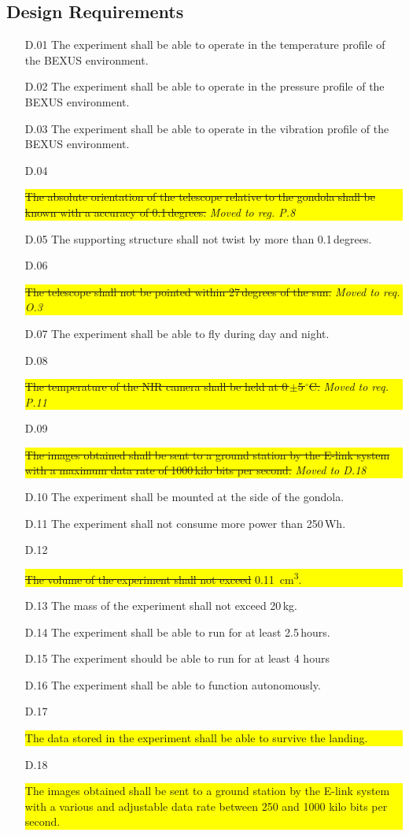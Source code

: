 \subsection{Design Requirements}

\begin{enumerate}[topsep=0pt,itemsep=-1ex,partopsep=1ex,parsep=1ex]
	\item[D.01] The experiment shall be able to operate in the temperature profile of the BEXUS environment.
	\item[D.02] The experiment shall be able to operate in the pressure profile of the BEXUS environment.
    \item[D.03] The experiment shall be able to operate in the vibration profile of the BEXUS environment.
    \item[D.04] \colorbox{yellow}{\parbox{\textwidth}{\st{The absolute orientation of the telescope relative to the gondola shall be known with a accuracy of 0.1\,degrees.} \textit{Moved to reg. P.8}}}
	\item[D.05] The supporting structure shall not twist by more than 0.1\,degrees.
	\item[D.06] \colorbox{yellow}{\parbox{\textwidth}{\st{The telescope shall not be pointed within 27\,degrees of the sun.} \textit{Moved to req. O.3}}}
	\item[D.07] The experiment shall be able to fly during day and night.
	\item[D.08] \colorbox{yellow}{\parbox{\textwidth}{\st{The temperature of the NIR camera shall be held at 0\,$\pm$5\,$^\circ$C.} \textit{Moved to req. P.11}}}
	\item[D.09] \colorbox{yellow}{\parbox{\textwidth}{\st{The images obtained shall be sent to a ground station by the E-link system with a maximum data rate of 1000\,kilo bits per second.} \textit{Moved to D.18}}}
	\item[D.10] The experiment shall be mounted at the side of the gondola.
	\item[D.11] The experiment shall not consume more power than 250\,Wh.
    \item[D.12] \colorbox{yellow}{\parbox{\textwidth}{\st{The volume of the experiment shall not exceed }\SI{0.11}{cm\cubed}.}}
    \item[D.13] The mass of the experiment shall not exceed 20\,kg.
    \item[D.14] The experiment shall be able to run for at least 2.5\,hours.
    \item [D.15] The experiment should be able to run for at least 4 hours
    \item[D.16] The experiment shall be able to function autonomously.
    \item[D.17] \colorbox{yellow}{\parbox{\textwidth}{The data stored in the experiment shall be able to survive the landing.}}
    \item[D.18] \colorbox{yellow}{\parbox{\textwidth}{The images obtained shall be sent to a ground station by the E-link system with a various and adjustable data rate between 250 and 1000 kilo bits per second.}}
\end{enumerate}
